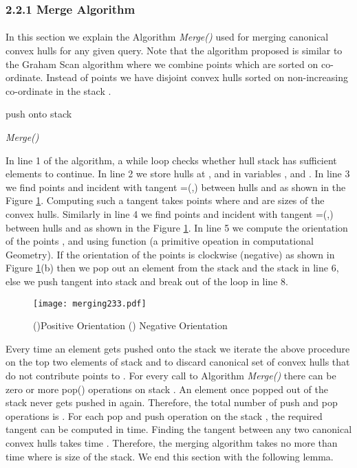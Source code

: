 \documentclass[runningheads,a4paper]{llncs}
\begin{document}
\subsubsection{2.2.1  Merge Algorithm}\label{merge-al}
\paragraph{}
In this section we explain the Algorithm \emph{Merge()} used for merging canonical
convex hulls for any given query.  Note that the algorithm proposed is similar
to the Graham Scan algorithm \cite{graham} where we combine points which are
sorted on  co-ordinate.
Instead of points we have disjoint convex hulls sorted on non-increasing  co-ordinate in the stack .
\begin{algorithm}\label{merging}
\KwData{, , }
push  onto stack \;
\caption{\em Merge()}
\end{algorithm}
In line 1 of the algorithm, a while loop checks whether hull stack  has
sufficient elements to continue.  In line 2 we store hulls at ,
 and  in variables ,  and .  In line
3 we find points  and  incident with tangent =(,) between hulls
 and  as shown in the Figure \ref{fig4}.  Computing such a tangent takes 
points where  and  are sizes of the convex
hulls.  Similarly in line 4 we find points  and
 incident with tangent =(,)
between hulls  and  as shown in the Figure \ref{fig4}.  In line 5 we compute the orientation of
the points ,  and  using function (a primitive opeation in computational Geometry). If the orientation of the points is
clockwise (negative) as shown in Figure \ref{fig4}(b) then we pop out an element from the stack  and
the stack  in line 6, else we push tangent  into stack  and break out of the loop in line 8.
\begin{figure}
\vspace{-0.5cm}
\centering
\texttt{[image: merging233.pdf]}
\caption{()Positive Orientation () Negative Orientation}
\label{fig4}
\vspace{-0.7cm}
\end{figure}
Every time an element gets pushed onto the stack we iterate the above
procedure on the top two elements of stack  and  to discard canonical set of
convex hulls  that do not contribute points to .
For every call to Algorithm \emph{Merge()} there
can be zero or more pop() operations on stack . An element once popped out
of the stack  never gets pushed in again. Therefore, the total number of
push and pop operations is . For each pop and push operation on
the stack , the required tangent can be computed in  time.
Finding the tangent between any two canonical convex hulls takes 
time \cite{kirkpatrick}.  Therefore, the merging algorithm takes no more than
 time where  is size of the stack. We end this section with the following lemma.
\end{document}
